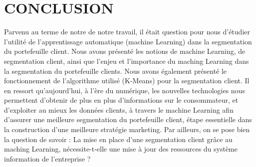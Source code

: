 \documentclass{article}
\begin{document}
\section{CONCLUSION}
Parvenu au terme de notre de notre travail, il était question pour nous d’étudier l’utilité de l’apprentissage automatique (machine Learning) dans la segmentation du portefeuille client. Nous avons présenté les notions de machine Learning, de segmentation client, ainsi que l’enjeu et  l’importance du maching Learning dans la segmentation du portefeuille clients. Nous avons également présenté le fonctionnement de l’algorithme utilisé (K-Means) pour la segmentation  client.  Il en ressort qu’aujourd’hui, à l’ère du numérique, les nouvelles technologies nous permettent d’obtenir de plus en plus d’informations sur le consommateur, et d’exploiter au mieux les données clients, à travers le machine Learning afin d’assurer une meilleure segmentation du portefeuille client, étape essentielle dans  la  construction d’une meilleure stratégie marketing. Par ailleurs, on se pose bien la question de savoir :  La mise en place d’une segmentation  client grâce au maching Learning, nécessite-t-elle une mise à jour des ressources du système information de l’entreprise ? 

\citep{1}
\citep{2}
\citep{3}
\citep{4}
\citep{5}
\citep{6}
\citep{7}
\citep{8}
\citep{9}
\citep{10}
\citep{11}
\citep{12}
\citep{13}
\citep{14}
\citep{15}
\citep{16}
\citep{17}
\citep{18}
\citep{19}
\citep{20}
\citep{21}
\citep{22}
\citep{23}
\citep{24}
\end{document}
